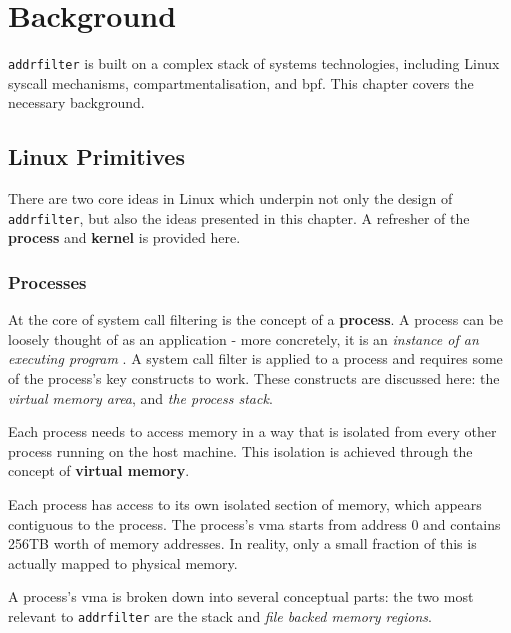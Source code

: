 \section{Background} \label{sec:background}



\texttt{addrfilter} is built on a complex stack of systems technologies,
including Linux syscall mechanisms, compartmentalisation, and \ac{bpf}. This
chapter covers the necessary background.

\subsection{Linux Primitives}

There are two core ideas in Linux which underpin not only the design of
\texttt{addrfilter}, but also the ideas presented in this chapter. A refresher
of the \textbf{process} and \textbf{kernel} is provided here.

\subsubsection{Processes}

At the core of system call filtering is the concept of a \textbf{process}. A
process can be loosely thought of as an application - more concretely, it is an
\textit{instance of an executing program} \cite{LINUX_PROGRAMMING_INTERFACE}. A
system call filter is applied to a process and requires some of the process's
key constructs to work. These constructs are discussed here: the \textit{virtual
memory area}, and \textit{the process stack}.

Each process needs to access memory in a way that is isolated from every other
process running on the host machine. This isolation is achieved through the
concept of \textbf{virtual memory}.

Each process has access to its own isolated section of memory, which appears
contiguous to the process. The process's \ac{vma} starts from address 0 and
contains 256TB worth of memory addresses. In reality, only a small fraction of
this is actually mapped to physical memory. 

A process's \ac{vma} is broken down into several conceptual parts: the two
most relevant to \texttt{addrfilter} are the stack and \textit{file backed
memory regions}.

